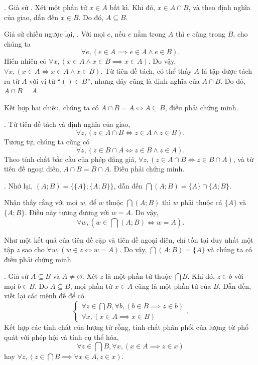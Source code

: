 . Giả sử . Xét một phần tử $x \in A$ bất kì. Khi đó, $x \in A \cap B$, và theo định nghĩa của giao, dẫn đến $x \in B$. Do đó, $A \subseteq B$.

Giả sử chiều ngược lại, . Với mọi $e$, nếu $e$ nằm trong $A$ thì $e$ cũng trong $B$, cho chúng ta
$$
\forall e, (e \in A \implies e \in A \land e \in B).
$$
Hiển nhiên có $\forall x, (x \in A \land x \in B \implies x \in A)$. Do vậy, $\forall x, (x \in A \iff x \in A \land x \in B)$. Từ tiên đề tách, có thể thấy $A$ là tập được tách ra từ $A$ với vị từ ``$() \in B$'', nhưng đây cũng là định nghĩa của $A \cap B$. Do đó, $A \cap B = A$.

Kết hợp hai chiều, chúng ta có $A \cap B = A \iff A \subseteq B$, điều phải chứng minh.

. Từ tiên đề tách và định nghĩa của giao,
\begin{equation*}
    \forall z, \left(z \in A \cap B \iff z \in A \land z \in B\right).
\end{equation*}
Tương tự, chúng ta cũng có
\begin{equation*}
    \forall z, \left(z \in B \cap A \iff z \in B \land z \in A\right).
\end{equation*}
Theo tính chất bắc cầu của phép đẳng giá, $\forall z, (z \in A \cap B \iff z \in B \cap A)$, và từ tiên đề ngoại diên, $A \cap B = B \cap A$. Điều phải chứng minh.

. Nhớ lại, $(A; B) = \{\{A\}; \{A; B\}\}$, dẫn đến $\bigcap (A; B) = \{A\} \cap \{A; B\}$.

Nhận thấy rằng với mọi $w$, để $w$ thuộc $\bigcap (A; B)$ thì $w$ phải thuộc cả $\{A\}$ và $\{A; B\}$. Điều này tương đương với $w = A$. Do vậy, $$\forall w, \left(w \in \bigcap (A; B) \iff w = A\right).$$

Như một kết quả của tiên đề cặp và tiên đề ngoại diên, chỉ tồn tại duy nhất một tập $z$ sao cho $\forall w, (w \in z \iff w = A)$. Do vậy, $\bigcap (A; B) = \{A\}$ và chúng ta có điều phải chứng minh.

. Giả sử $A \subseteq B$ và $A \neq \varnothing$. Xét $z$ là một phần tử thuộc $\bigcap B$. Khi đó, $z \in b$ với mọi $b \in B$. Do $A \subseteq B$, mọi phần tử $x \in A$ cũng là một phần tử của $B$. Dẫn đến, viết lại các mệnh đề để có
\begin{equation*}
    \begin{cases}
        \forall z \in \bigcap B, \forall b, (b \in B \implies z \in b) \\
        \forall x, (x \in A \implies x \in B)
    \end{cases}.
\end{equation*}
Kết hợp các tính chất của lượng từ rỗng, tính chất phân phối của lượng từ phổ quát với phép hội và tính cụ thể hóa,
\begin{equation*}
    \forall z \in \bigcap B, \forall x, (x \in A \implies z \in x)
\end{equation*}
hay $\forall z, \left(z \in \bigcap B \implies \forall x \in A, z \in x\right)$. 


